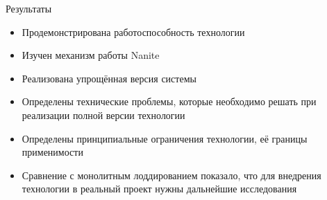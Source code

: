 \begin{frame}{Результаты}
    \begin{itemize}
        \item Продемонстрирована работоспособность технологии
        \item Изучен механизм работы Nanite
        \item Реализована упрощённая версия системы
        \item Определены технические проблемы, которые необходимо решать при реализации полной версии технологии
        \item Определены принципиальные ограничения технологии, её границы применимости
        \item Сравнение с монолитным лоддированием показало, что для внедрения технологии в реальный проект нужны дальнейшие исследования
    \end{itemize}
\end{frame}
